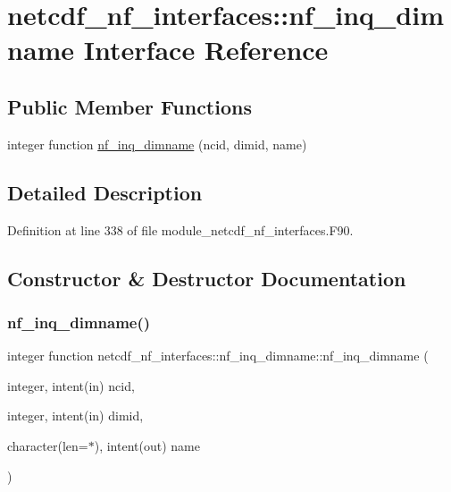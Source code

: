 \hypertarget{interfacenetcdf__nf__interfaces_1_1nf__inq__dimname}{}\section{netcdf\+\_\+nf\+\_\+interfaces\+:\+:nf\+\_\+inq\+\_\+dimname Interface Reference}
\label{interfacenetcdf__nf__interfaces_1_1nf__inq__dimname}
\subsection*{Public Member Functions}
\begin{DoxyCompactItemize}
\item 
integer function \hyperlink{interfacenetcdf__nf__interfaces_1_1nf__inq__dimname_a5cb2e7ce06131db05d8bff1b30f325be}{nf\+\_\+inq\+\_\+dimname} (ncid, dimid, name)
\end{DoxyCompactItemize}


\subsection{Detailed Description}


Definition at line 338 of file module\+\_\+netcdf\+\_\+nf\+\_\+interfaces.\+F90.



\subsection{Constructor \& Destructor Documentation}
\mbox{\label{interfacenetcdf__nf__interfaces_1_1nf__inq__dimname_a5cb2e7ce06131db05d8bff1b30f325be}} 
\subsubsection{\texorpdfstring{nf\+\_\+inq\+\_\+dimname()}{nf\_inq\_dimname()}}
{\footnotesize\ttfamily integer function netcdf\+\_\+nf\+\_\+interfaces\+::nf\+\_\+inq\+\_\+dimname\+::nf\+\_\+inq\+\_\+dimname (\begin{DoxyParamCaption}\item[{integer, intent(in)}]{ncid,  }\item[{integer, intent(in)}]{dimid,  }\item[{character(len=$\ast$), intent(out)}]{name }\end{DoxyParamCaption})}



